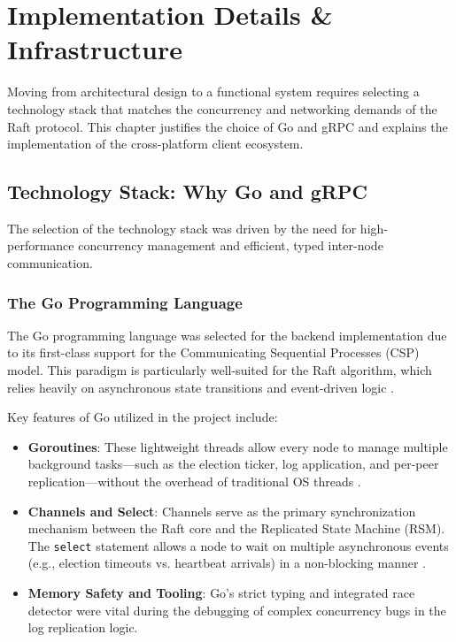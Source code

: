 \chapter{Implementation Details \& Infrastructure}
\label{ch:implementation_details}

Moving from architectural design to a functional system requires selecting a technology stack that matches the concurrency and networking demands of the Raft protocol. This chapter justifies the choice of Go and gRPC and explains the implementation of the cross-platform client ecosystem.

\section{Technology Stack: Why Go and gRPC}
The selection of the technology stack was driven by the need for high-performance concurrency management and efficient, typed inter-node communication.

\subsection{The Go Programming Language}
The Go programming language was selected for the backend implementation due to its first-class support for the Communicating Sequential Processes (CSP) model. This paradigm is particularly well-suited for the Raft algorithm, which relies heavily on asynchronous state transitions and event-driven logic \cite{GoConcurrency2017}.

Key features of Go utilized in the project include:
\begin{itemize}
    \item \textbf{Goroutines}: These lightweight threads allow every node to manage multiple background tasks—such as the election ticker, log application, and per-peer replication—without the overhead of traditional OS threads \cite{raft_go}.
    \item \textbf{Channels and Select}: Channels serve as the primary synchronization mechanism between the Raft core and the Replicated State Machine (RSM). The \texttt{select} statement allows a node to wait on multiple asynchronous events (e.g., election timeouts vs. heartbeat arrivals) in a non-blocking manner \cite{raft_go, rsm_go}.
    \item \textbf{Memory Safety and Tooling}: Go's strict typing and integrated race detector were vital during the debugging of complex concurrency bugs in the log replication logic.
\end{itemize}

